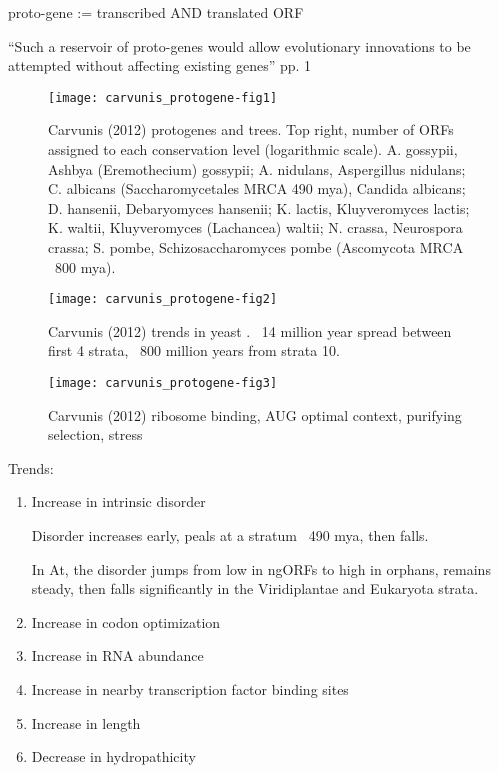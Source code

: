     proto-gene := transcribed AND translated ORF
    
    ``Such a reservoir of proto-genes would allow evolutionary innovations
    to be attempted without affecting existing genes'' pp. 1

    \begin{figure}[!ht] \centering
        \texttt{[image: carvunis\_protogene-fig1]} \caption{
            Carvunis (2012) protogenes and trees. Top right, number of ORFs
            assigned to each conservation level (logarithmic scale). A.
            gossypii, Ashbya (Eremothecium) gossypii; A. nidulans,
            Aspergillus nidulans; C. albicans (Saccharomycetales MRCA 490
            mya), Candida albicans; D. hansenii, Debaryomyces hansenii; K.
            lactis, Kluyveromyces lactis; K. waltii, Kluyveromyces
        (Lachancea) waltii; N. crassa, Neurospora crassa; S. pombe,
    Schizosaccharomyces pombe (Ascomycota MRCA ~800 mya).  } \end{figure}
    \begin{figure}[!ht] \centering
        \texttt{[image: carvunis\_protogene-fig2]} \caption{
            Carvunis (2012) trends in yeast
            \cite{carvunis_proto-genes_2012}.  ~14 million year spread
            between first 4 strata, ~800 million years from strata 10.  }
        \end{figure}
    \begin{figure}[!ht] \centering
        \texttt{[image: carvunis\_protogene-fig3]} \caption{
        Carvunis (2012) ribosome binding, AUG optimal context, purifying
    selection, stress } \end{figure}
    \FloatBarrier

    Trends:

    \begin{enumerate}
        
        \item Increase in intrinsic disorder

        Disorder increases early, peals at a stratum ~490 mya, then falls.

        In At, the disorder jumps from low in ngORFs to high in orphans,
        remains steady, then falls significantly in the Viridiplantae and
        Eukaryota strata.

        \item Increase in codon optimization \item Increase in RNA abundance
    \item Increase in nearby transcription factor binding sites \item
    Increase in length \item Decrease in hydropathicity \end{enumerate}

